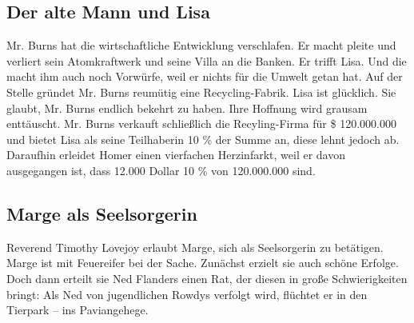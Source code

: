 \subsection{Der alte Mann und Lisa}\label{4F17}
Mr. Burns hat die wirtschaftliche Entwicklung verschlafen. Er macht pleite und verliert sein Atomkraftwerk und seine Villa an die Banken. Er trifft Lisa. Und die macht ihm auch noch Vorwürfe, weil er nichts für die Umwelt getan hat. Auf der Stelle gründet Mr. Burns reumütig eine Recycling-Fabrik. Lisa ist glücklich. Sie glaubt, Mr. Burns endlich bekehrt zu haben. Ihre Hoffnung wird grausam enttäuscht. Mr. Burns verkauft schließlich die Recyling-Firma für \$ 120.000.000 und bietet Lisa als seine Teilhaberin 10 \% der Summe an, diese lehnt jedoch ab. Daraufhin erleidet Homer einen vierfachen Herzinfarkt, weil er davon ausgegangen ist, dass 12.000 Dollar 10 \% von 120.000.000 sind.

	
\subsection{Marge als Seelsorgerin}\label{4F18}
Reverend Timothy Lovejoy erlaubt Marge, sich als Seelsorgerin zu betätigen. Marge ist mit Feuereifer bei der Sache. Zunächst erzielt sie auch schöne Erfolge. Doch dann erteilt sie Ned Flanders einen Rat, der diesen in große Schwierigkeiten bringt: Als Ned von jugendlichen Rowdys verfolgt wird, flüchtet er in den Tierpark -- ins Paviangehege.


